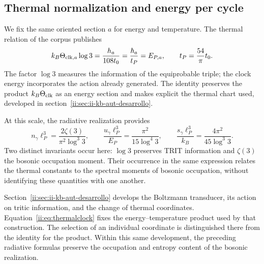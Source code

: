 \subsection{Thermal normalization and energy per cycle}
We fix the same oriented section \(a\) for energy and
temperature. The thermal relation of the corpus publishes
\begin{equation}
k_B\Theta_{{\rm clk},a}\log3
=\frac{h_a}{108t_0}
=\frac{\hbar_a}{t_P}=E_{P,a},
\qquad t_P=\frac{54}{\pi}t_0.
\label{ii:eq:thermalclock}
\end{equation}
The factor $\log3$ measures the information of the equiprobable triple;
the clock energy incorporates the action already generated.
The identity preserves the product $k_B\Theta_{\rm clk}$ as an energy
section and makes explicit the thermal chart used, developed in section~\ref{ii:sec:ii-kb-aut-desarrollo}.

At this scale, the radiative realization provides
\[
n_\gamma\ell_P^3=\frac{2\zeta(3)}{\pi^2\log^3 3},\qquad
\frac{u_\gamma\ell_P^3}{E_P}
=\frac{\pi^2}{15\log^4 3},\qquad
\frac{s_\gamma\ell_P^3}{k_B}
=\frac{4\pi^2}{45\log^3 3}.
\]
Two distinct invariants occur here: $\log3$ preserves TRIT
information and $\zeta(3)$ the bosonic occupation moment.
Their occurrence in the same expression relates the thermal constants
to the spectral moments of bosonic occupation, without identifying
these quantities with one another.

Section~\ref{ii:sec:ii-kb-aut-desarrollo} develops the Boltzmann
transducer, its action on tritic information, and the change of
thermal coordinates. Equation~\eqref{ii:eq:thermalclock} fixes the
energy--temperature product used by that construction. The
selection of an individual coordinate is distinguished there from the
identity for the product. Within this same development, the preceding radiative formulas
preserve the occupation and entropy content
of the bosonic realization.

